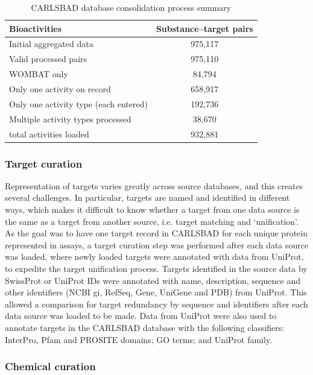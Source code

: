 \begin{table}
\centering
\begin{tabular}{l|c}
\hline
\textbf{Bioactivities} & \textbf{Substance–target pairs} \\
\hline
Initial aggregated data & 975,117\\
Valid processed pairs & 975,110\\
WOMBAT only & 84,794\\
Only one activity on record & 658,917\\
Only one activity type (each entered) & 192,736\\ 
Multiple activity types processed & 38,670\\
total activities loaded & 932,881\\
\hline
\end{tabular}
\caption{CARLSBAD database consolidation process summary}
\label{tab:cb_01}
\end{table}


\subsubsection{Target curation}

Representation of targets varies greatly across source databases, and this creates several challenges. In particular, targets are named and identified in different ways, which makes it difficult to know whether a target from one data source is the same as a target from another source, i.e. target matching and ‘unification’. As the goal was to have one target record in CARLSBAD for each unique protein represented in assays, a target curation step was performed after each data source was loaded, where newly loaded targets were annotated with data from UniProt\cite{UniProt_Consortium2018-kq}, to expedite the target unification process. Targets identified in the source data by SwissProt or UniProt IDs were annotated with name, description, sequence and other identifiers (NCBI gi, RefSeq, Gene, UniGene and PDB) from UniProt. This allowed a comparison for target redundancy by sequence and identifiers after each data source was loaded to be made. Data from UniProt were also used to annotate targets in the CARLSBAD database with the following classifiers: InterPro, Pfam and PROSITE domains; GO terms; and UniProt family.

\subsubsection{Chemical curation}

